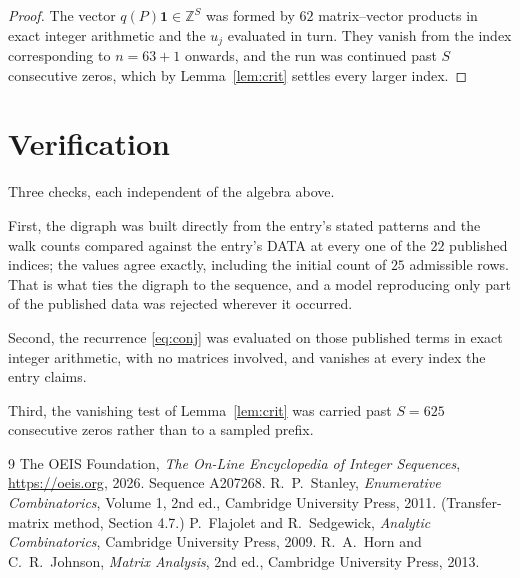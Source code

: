 \documentclass[11pt,a4paper]{article}
\theoremstyle{plain}
\theoremstyle{definition}
\begin{document}
\begin{proof}
The vector $q(P)\mathbf{1}\in\mathbb{Z}^{S}$ was formed by $62$ matrix--vector
products in exact integer arithmetic and the $u_j$ evaluated in turn. They vanish from the
index corresponding to $n=63+1$ onwards, and the run was continued past $S$ consecutive
zeros, which by Lemma~\ref{lem:crit} settles every larger index.
\end{proof}

\section{Verification}

Three checks, each independent of the algebra above.

First, the digraph was built directly from the entry's stated patterns and the walk counts
compared against the entry's DATA at every one of the $22$ published indices; the
values agree exactly, including the initial count of $25$ admissible rows. That is
what ties the digraph to the sequence, and a model reproducing only part of the published
data was rejected wherever it occurred.

Second, the recurrence \eqref{eq:conj} was evaluated on those published terms in exact
integer arithmetic, with no matrices involved, and vanishes at every index the entry claims.

Third, the vanishing test of Lemma~\ref{lem:crit} was carried past $S=625$ consecutive
zeros rather than to a sampled prefix.

\begin{thebibliography}{9}
 The OEIS Foundation, \emph{The On-Line Encyclopedia of Integer
Sequences}, \url{https://oeis.org}, 2026. Sequence A207268.
 R.~P.~Stanley, \emph{Enumerative Combinatorics}, Volume 1, 2nd ed.,
Cambridge University Press, 2011. (Transfer-matrix method, Section 4.7.)
 P.~Flajolet and R.~Sedgewick, \emph{Analytic Combinatorics}, Cambridge
University Press, 2009.
 R.~A.~Horn and C.~R.~Johnson, \emph{Matrix Analysis}, 2nd ed., Cambridge
University Press, 2013.
\end{thebibliography}
\end{document}
